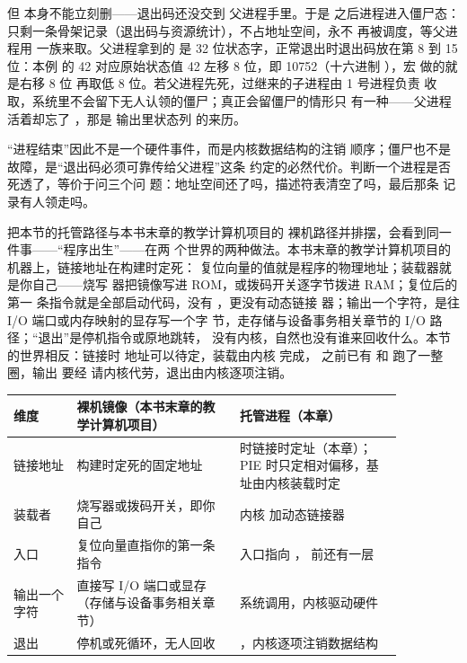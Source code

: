 但  本身不能立刻删——退出码还没交到
父进程手里。于是  之后进程进入僵尸态：
只剩一条骨架记录（退出码与资源统计），不占地址空间，永不
再被调度，等父进程用  一族来取。父进程拿到的
是 32 位状态字，正常退出时退出码放在第 8 到 15 位：本例
的 42 对应原始状态值 42 左移 8 位，即 10752（十六进制
），宏  做的就是右移 8 位
再取低 8 位。若父进程先死，过继来的子进程由 1 号进程负责
收取，系统里不会留下无人认领的僵尸；真正会留僵尸的情形只
有一种——父进程活着却忘了 ，那是 
输出里状态列  的来历。

“进程结束”因此不是一个硬件事件，而是内核数据结构的注销
顺序；僵尸也不是故障，是“退出码必须可靠传给父进程”这条
约定的必然代价。判断一个进程是否死透了，等价于问三个问
题：地址空间还了吗，描述符表清空了吗，最后那条
 记录有人领走吗。

把本节的托管路径与本书末章的教学计算机项目的
裸机路径并排摆，会看到同一件事——“程序出生”——在两
个世界的两种做法。本书末章的教学计算机项目的机器上，链接地址在构建时定死：
复位向量的值就是程序的物理地址；装载器就是你自己——烧写
器把镜像写进 ROM，或拨码开关逐字节拨进 RAM；复位后的第一
条指令就是全部启动代码，没有 ，更没有动态链接
器；输出一个字符，是往 I/O 端口或内存映射的显存写一个字
节，走存储与设备事务相关章节的 I/O 路径；“退出”是停机指令或原地跳转，
没有内核，自然也没有谁来回收什么。本节的世界相反：链接时
地址可以待定，装载由内核  完成，
之前已有  和  跑了一整圈，输出
要经  请内核代劳，退出由内核逐项注销。

\begin{longtable}{L{0.14\linewidth}L{0.36\linewidth}L{0.36\linewidth}}
\toprule
维度 & 裸机镜像（本书末章的教学计算机项目） & 托管进程（本章） \\
\midrule
链接地址 & 构建时定死的固定地址 &  时链接时定址（本章）；PIE 时只定相对偏移，基址由内核装载时定 \\\tablerowrule
装载者 & 烧写器或拨码开关，即你自己 & 内核  加动态链接器 \\\tablerowrule
入口 & 复位向量直指你的第一条指令 & 入口指向 ， 前还有一层 \\\tablerowrule
输出一个字符 & 直接写 I/O 端口或显存（存储与设备事务相关章节） &  系统调用，内核驱动硬件 \\\tablerowrule
退出 & 停机或死循环，无人回收 & ，内核逐项注销数据结构 \\
\bottomrule
\end{longtable}

